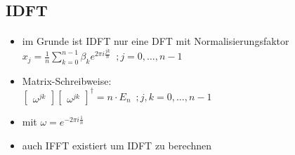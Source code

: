 \subsection{IDFT}
\begin{frame}{\insertsection}
	\framesubtitle{\insertsubsection}
	
	\begin{itemize}
		\item im Grunde ist IDFT nur eine DFT mit Normalisierungsfaktor
		\\ $x_j = \frac{1}{n} \sum\limits_{k=0}^{n-1} \beta_k e^{2\pi i \frac{jk}{n}} \enspace ; j=0,\ldots,n-1$ \vspace{0.5em}
		\item Matrix-Schreibweise: \\ %
		$\begin{bmatrix}
			\omega^{jk}
		\end{bmatrix}
		\begin{bmatrix}
			\omega^{jk}
		\end{bmatrix}^\dag
		= n \cdot E_n
		\enspace; j,k=0,\ldots,n-1$
		\item[] mit $\omega = e^{-2\pi i \frac{1}{n}}$
		\item auch IFFT existiert um IDFT zu berechnen
	\end{itemize}
\end{frame}


